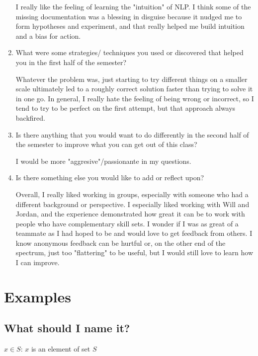 \documentclass{report}
\begin{document}
\begin{enumerate}
          I really like the feeling of learning the "intuition" of NLP. I think some of the missing documentation was a blessing in disguise because it nudged me to form hypotheses and experiment, and that really helped me build intuition and a bias for action.

    \item What were some strategies/ techniques you used or discovered that helped you in the first half of the semester?

          Whatever the problem was, just starting to try different things on a smaller scale ultimately led to a roughly correct solution faster than trying to solve it in one go. In general, I really hate the feeling of being wrong or incorrect, so I tend to try to be perfect on the first attempt, but that approach always backfired.

    \item Is there anything that you would want to do differently in the second half of the semester to improve what you can get out of this class?

          I would be more "aggresive"/passionante in my questions. 

    \item Is there something else you would like to add or reflect upon?

          Overall, I really liked working in groups, especially with someone who had a different background or perspective. I especially liked working with Will and Jordan, and the experience demonstrated how great it can be to work with people who have complementary skill sets. I wonder if I was as great of a teammate as I had hoped to be and would love to get feedback from others. I know anonymous feedback can be hurtful or, on the other end of the spectrum, just too "flattering" to be useful, but I would still love to learn how I can improve. 

\end{enumerate}

\chapter{Examples}
\section{What should I name it?}

\notation

$x \in S$: $x$ is an element of set $S$
\end{document}
